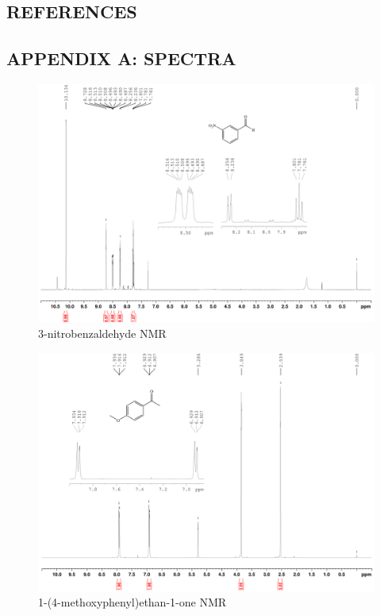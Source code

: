 \documentclass[11pt]{article}
\begin{document}
\newpage
\subsection*{REFERENCES}
\vspace{2mm}


\setcounter{figure}{0}
\newpage
\subsection*{APPENDIX A: SPECTRA}
\begin{figure}[h]
    \centering
    \includegraphics[scale=0.105]{spectra/nmr4.1.png}
    \caption{3-nitrobenzaldehyde NMR}
\end{figure}
\begin{figure}[h!]
    \centering
    \includegraphics[scale=0.105]{spectra/nmr5.1.png}
    \caption{1-(4-methoxyphenyl)ethan-1-one NMR}
\end{figure}
\end{document}
